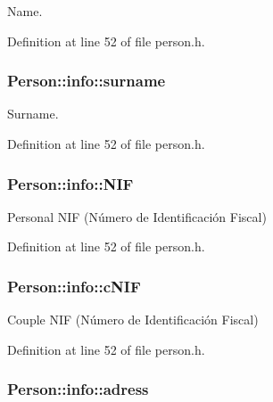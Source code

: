 Name. 



Definition at line 52 of file person.\+h.

\hypertarget{struct_person_1_1info_a5dffef4c24ab24eaa62a3428e04b4239}{
\subsubsection[{surname}]{\setlength{\rightskip}{0pt plus 5cm}Person\+::info\+::surname}}\label{struct_person_1_1info_a5dffef4c24ab24eaa62a3428e04b4239}


Surname. 



Definition at line 52 of file person.\+h.

\hypertarget{struct_person_1_1info_ab91922388b5ba74969a7d8f7a4fad95b}{
\subsubsection[{N\+I\+F}]{\setlength{\rightskip}{0pt plus 5cm}Person\+::info\+::\+N\+I\+F}}\label{struct_person_1_1info_ab91922388b5ba74969a7d8f7a4fad95b}


Personal N\+I\+F (Número de Identificación Fiscal) 



Definition at line 52 of file person.\+h.

\hypertarget{struct_person_1_1info_a3ee6bcba23c2257f4571084e7a734e6d}{
\subsubsection[{c\+N\+I\+F}]{\setlength{\rightskip}{0pt plus 5cm}Person\+::info\+::c\+N\+I\+F}}\label{struct_person_1_1info_a3ee6bcba23c2257f4571084e7a734e6d}


Couple N\+I\+F (Número de Identificación Fiscal) 



Definition at line 52 of file person.\+h.

\hypertarget{struct_person_1_1info_a350817c964e878c2c59019eb51e9f608}{
\subsubsection[{adress}]{\setlength{\rightskip}{0pt plus 5cm}Person\+::info\+::adress}}\label{struct_person_1_1info_a350817c964e878c2c59019eb51e9f608}


